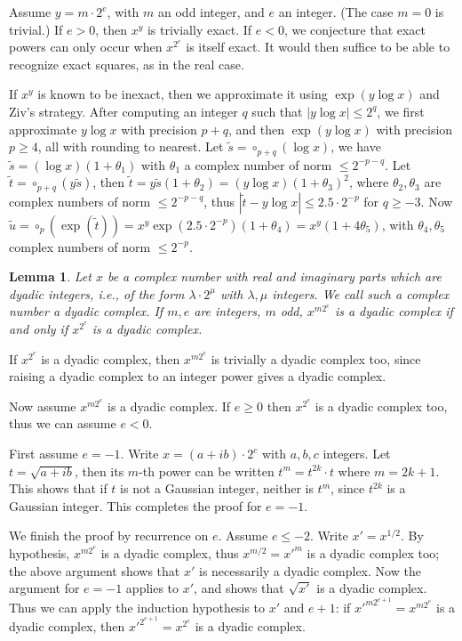 \documentclass {article}
\newtheorem{lemma}{Lemma}
\def\eos{\vrule height7pt width 6pt depth 0pt} %
\newenvironment{proof}{\par\noindent{\bf Proof:}}{{\hfill\eos}\par\smallskip}
\begin{document}
Assume $y = m \cdot 2^e$, with $m$ an odd integer, and $e$ an integer.
(The case $m=0$ is trivial.)
If $e > 0$, then $x^y$ is trivially exact.
If $e < 0$, we conjecture that exact powers can only occur when
$x^{2^e}$ is itself exact.
It would then suffice to be able to recognize exact squares, as in the real
case.

If $x^y$ is known to be inexact, then we approximate it using
$\exp(y \log x)$ and Ziv's strategy.
After computing an integer $q$ such that $|y \log x| \leq 2^q$, we first
approximate $y \log x$ with precision $p + q$, and then
$\exp(y \log x)$ with precision $p \geq 4$, all with rounding
to nearest.
Let $\tilde{s} = \circ_{p+q}(\log x)$,
we have $\tilde{s} = (\log x) (1 + \theta_1)$
with $\theta_1$ a complex number of norm $\leq 2^{-p-q}$.
Let $\tilde{t} = \circ_{p+q}(y \tilde{s})$, then
$\tilde{t} = y \tilde{s} (1 + \theta_2) = (y \log x) (1 + \theta_3)^2$,
where $\theta_2, \theta_3$ are complex numbers of norm $\leq 2^{-p-q}$,
thus $|\tilde{t} - y \log x| \leq 2.5 \cdot 2^{-p}$ for $q \geq -3$.
Now $\tilde{u} = \circ_p(\exp(\tilde{t})) =
x^y \exp(2.5 \cdot 2^{-p}) (1 + \theta_4) = x^y (1 + 4 \theta_5)$,
with $\theta_4, \theta_5$ complex numbers of norm $\leq 2^{-p}$.

\begin{lemma}
Let $x$ be a complex number with real and imaginary parts which are
dyadic integers, i.e., of the form $\lambda \cdot 2^{\mu}$ with
$\lambda, \mu$ integers. We call such a complex number a 
\emph{dyadic complex}.
If $m, e$ are integers, $m$ odd,
$x^{m 2^e}$ is a dyadic complex if and only if $x^{2^e}$ is a dyadic complex.
\end{lemma}
\begin{proof}
If $x^{2^e}$ is a dyadic complex, then $x^{m 2^e}$ is trivially a
dyadic complex too, since raising a dyadic complex to an integer power
gives a dyadic complex.

Now assume $x^{m 2^e}$ is a dyadic complex. If $e \geq 0$ then $x^{2^e}$ is
a dyadic complex too, thus we can assume $e < 0$.

First assume $e=-1$.
Write $x = (a + i b) \cdot 2^c$ with $a, b, c$ integers.
Let $t = \sqrt{a + i b}$, then its $m$-th power
can be written $t^m = t^{2k} \cdot t$ where $m=2k+1$.
This shows that if $t$ is not a Gaussian integer, neither is $t^m$, since
$t^{2k}$ is a Gaussian integer. This completes the proof for $e=-1$.

We finish the proof by recurrence on $e$. Assume $e \leq -2$.
Write $x' = x^{1/2}$. By hypothesis, $x^{m 2^e}$ is a dyadic complex,
thus $x^{m/2} = x'^m$ is a dyadic complex too; the above argument shows that
$x'$ is necessarily a dyadic complex.
Now the argument for $e=-1$ applies to $x'$, and shows
that $\sqrt{x'}$ is a dyadic complex. Thus we can apply the induction
hypothesis to $x'$ and $e+1$: if $x'^{m 2^{e+1}} = x^{m 2^e}$ is a dyadic
complex, then $x'^{2^{e+1}} = x^{2^e}$ is a dyadic complex.
\end{proof}



\end{document}
